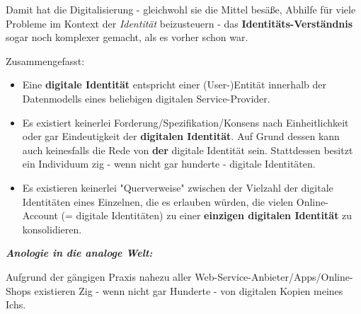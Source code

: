 \vspace{0.3cm}

Damit hat die Digitalisierung - gleichwohl sie die Mittel besäße, Abhilfe für viele Probleme im Kontext der \textit{Identität} beizusteuern - das \textbf{Identitäts-Verständnis} sogar noch komplexer gemacht, als es vorher schon war.

Zusammengefasst:

\vspace{0.3cm}

\begin{Fazit}

\begin{itemize}
  \item Eine \textbf{digitale Identität} entspricht einer (User-)Entität innerhalb der Datenmodells eines beliebigen digitalen Service-Provider.
  \item Es existiert keinerlei Forderung/Spezifikation/Konsens nach Einheitlichkeit oder gar Eindeutigkeit der \textbf{digitalen Identität}. Auf Grund dessen kann auch keinesfalls die Rede von \textbf{der} digitale Identität sein. Stattdessen besitzt ein Individuum zig - wenn nicht gar hunderte - digitale Identitäten. 
  \item Es existieren keinerlei "Querverweise" zwischen der Vielzahl der digitale Identitäten eines Einzelnen, die es erlauben würden, die vielen Online-Account (= digitale Identitäten) zu einer \textbf{einzigen digitalen Identität} zu konsolidieren.
\end{itemize}

\end{Fazit}

\vspace{0.3cm}


\vspace{0.3cm}

\textbf{\textit{Anologie in die analoge Welt:}}

\vspace{0.3cm}

Aufgrund der gängigen Praxis nahezu aller Web-Service-Anbieter/Apps/Online-Shops existieren Zig - wenn nicht gar Hunderte - von digitalen Kopien meines Ichs. 

